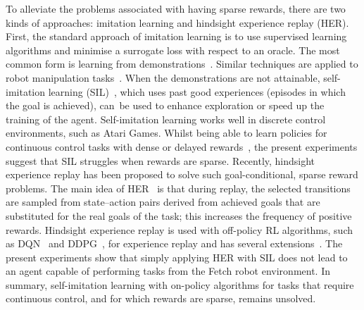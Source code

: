 To alleviate the problems associated with having sparse rewards, there are two kinds of approaches: imitation learning and hindsight experience replay (HER). First, the standard approach of imitation learning is to use supervised learning algorithms and minimise a surrogate loss with respect to an oracle. The most common form is learning from demonstrations~\cite{hester2018deep,gao2018reinforcement}. Similar techniques are applied to robot manipulation tasks~\cite{rajeswaran2017learning,vevcerik2017leveraging,nair2018overcoming,james2018task}. When the demonstrations are not attainable, self-imitation learning (SIL)~\cite{oh2018self}, which uses past good experiences (episodes in which the goal is achieved), can~be used to enhance exploration or speed up the training of the agent. {Self-imitation learning} works well in discrete control environments, such as Atari Games. Whilst being able to learn policies for continuous control tasks with dense or delayed rewards~\cite{oh2018self}, {the present} experiments suggest that SIL struggles when rewards are sparse. Recently, {hindsight experience replay} has been proposed to solve such goal-conditional, sparse reward problems. The main idea of HER~\cite{andrychowicz2017hindsight} is that during replay, the selected transitions are sampled from state--action pairs derived from {achieved goals} that are substituted for the real goals of the task; this increases the frequency of positive rewards. {Hindsight experience replay} is used with off-policy RL algorithms, such as DQN~\cite{mnih2015human} and DDPG~\cite{lillicrap2015continuous}, for experience replay and has several extensions~\cite{schaul2015prioritized,liu2018competitive}. The present experiments show that simply applying HER with SIL does not lead to an agent capable of performing tasks from the Fetch robot environment. In summary, self-imitation learning with on-policy algorithms for tasks that require continuous control, and for which rewards are sparse, remains unsolved.

